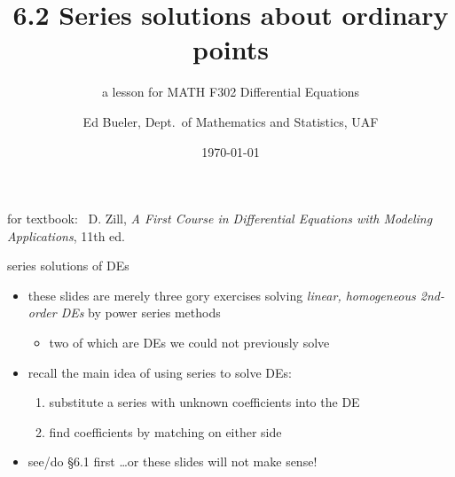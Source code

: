 \documentclass[urlcolor=blue,dvipsnames]{beamer}
\title{6.2 Series solutions about ordinary points}
\subtitle{a lesson for MATH F302 Differential Equations}
\author{Ed Bueler, Dept.~of Mathematics and Statistics, UAF}
\date{\tiny \today}
\begin{document}
\renewcommand{\thefootnote}{{\color{green} \arabic{footnote}}}

\begin{frame}
\titlepage

\centerline{\tiny for textbook: \, D. Zill, \emph{A First Course in Differential Equations with Modeling Applications}, 11th ed.}
\end{frame}


\begin{frame}{series solutions of DEs}

\begin{itemize}
\item these slides are merely three gory exercises solving \emph{linear, homogeneous 2nd-order DEs} by power series methods
    \begin{itemize}
    \item two of which are DEs we could not previously solve
    \end{itemize}
\item recall the main idea of using series to solve DEs:

\medskip
\begin{enumerate}
\item substitute a series with unknown coefficients into the DE
\item find coefficients by matching on either side
\end{enumerate}

\medskip
\item see/do \S6.1 first \dots or these slides will not make sense!
\end{itemize}
\end{frame}
\end{document}
